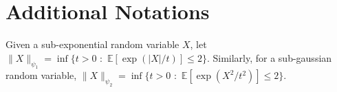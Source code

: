 \documentclass[11pt]{article}
\def\RR{\mathbb{R}}
\def\Set#1{\left\{ #1 \right\}}
\newcommand{\E}{\mathbb{E}}
\newcommand{\distasNormal}{\mathbin{\overset{iid}{\sim}\mathcal{N}(0,1)}}
\newtheorem{lemma}[theorem]{Lemma}
\newcommand{\norm}[1]{\left\|#1\right\|}
\newcommand{\svmin}[1]{\sigma_{\rm min}\left(#1\right)}
\newcommand{\evmax}[1]{\lambda_{\rm max}\left(#1\right)}
\newcommand{\evmin}[1]{\lambda_{\rm min}\left(#1\right)}
\def\op{\mathrm{op}}
\def\PP{\mathbb{P}}
\begin{document}
 \newpage



 
\onecolumn 
\appendix 
\section{Additional Notations}\label{sec:app}
Given a sub-exponential random variable $X$, let
    $\|X\|_{\psi_1} = \inf \{ t>0 \,\,: \,\,\mathbb E[\exp(|X|/t)] \le 2 \}.$
Similarly, for a sub-gaussian random variable, 
    $\|X\|_{\psi_2} = \inf \{ t>0 \,\,: \,\,\mathbb E[\exp(X^2/t^2)] \le 2 \}.$


\end{document}
